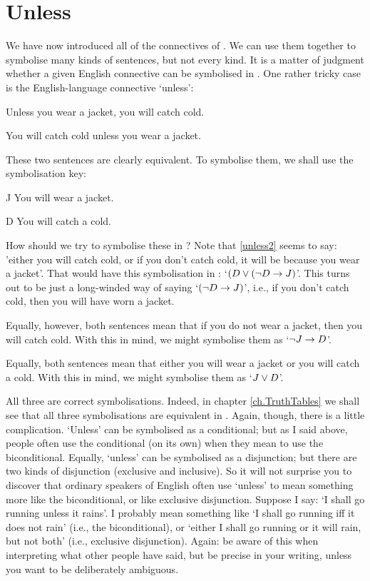 \section{Unless}
We have now introduced all of the connectives of \TFL. We can use them together to symbolise many kinds of sentences, but not every kind. It is a matter of judgment whether a given English connective can be symbolised in \TFL. One rather tricky case is the English-language connective `unless':
\begin{earg}
\item[\ex{unless1}] Unless you wear a jacket, you will catch cold. 
\item[\ex{unless2}] You will catch cold unless you wear a jacket. 
\end{earg}
These two sentences are clearly equivalent. To symbolise them, we shall use the symbolisation key:
	\begin{ekey}
		\item[J] You will wear a jacket.
		\item[D] You will catch a cold.
	\end{ekey}
How should we try to symbolise these in \TFL? Note that \ref{unless2} seems to say: 'either you will catch cold, or if you don't catch cold, it will be because you wear a jacket'. That would have this symbolisation in \TFL: `$(D \vee (\neg D \rightarrow J)$'. This turns out to be just a long-winded way of saying `$(\neg D \rightarrow J)$', i.e., if you don't catch cold, then you will have worn a jacket. 

Equally, however, both sentences mean that if you do not wear a jacket, then you will catch cold. With this in mind, we might symbolise them as `$\neg J \rightarrow D$'. 

Equally, both sentences mean that either you will wear a jacket or you will catch a cold. With this in mind, we might symbolise them as `$J \vee D$'.

All three are correct symbolisations. Indeed, in chapter \ref{ch.TruthTables} we shall see that all three symbolisations are equivalent in \TFL.
Again, though, there is a little complication. `Unless' can be symbolised as a conditional; but as I said above, people often use the conditional (on its own) when they mean to use the biconditional. Equally, `unless' can be symbolised as a disjunction; but there are two kinds of disjunction (exclusive and inclusive). So it will not surprise you to discover that ordinary speakers of English often use `unless' to mean something more like the biconditional, or like exclusive disjunction. Suppose I say: `I shall go running unless it rains'. I probably mean something like `I shall go running iff it does not rain' (i.e., the biconditional), or  `either I shall go running or it will rain, but not both' (i.e., exclusive disjunction). Again: be aware of this when interpreting what other people have said, but be precise in your writing, unless you want to be deliberately ambiguous.

